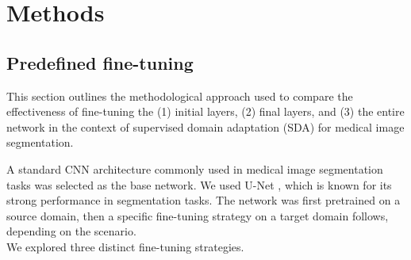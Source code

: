 \section{Methods}


\subsection{Predefined fine-tuning}
\label{sec:mri:method:sft}

This section outlines the methodological approach used to compare the effectiveness of fine-tuning the (1) initial layers, (2) final layers, and (3) the entire network in the context of supervised domain adaptation (SDA) for medical image segmentation.

A standard CNN architecture commonly used in medical image segmentation tasks was selected as the base network. We used U-Net \cite{unet}, which is known for its strong performance in segmentation tasks. The network was first pretrained on a source domain, then a specific fine-tuning strategy on a target domain follows, depending on the scenario.\\

We explored three distinct fine-tuning strategies.

